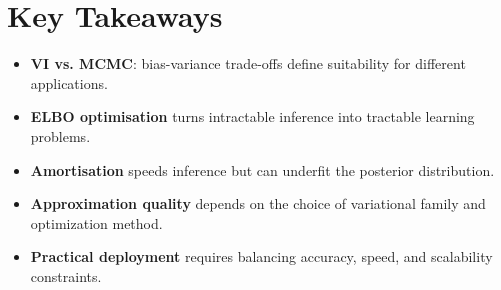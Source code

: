 
\section*{Key Takeaways}

\begin{keytakeaways}
\begin{itemize}[leftmargin=2em]
    \item \textbf{VI vs. MCMC}: bias-variance trade-offs define suitability for different applications.
    \item \textbf{ELBO optimisation} turns intractable inference into tractable learning problems.
    \item \textbf{Amortisation} speeds inference but can underfit the posterior distribution.
    \item \textbf{Approximation quality} depends on the choice of variational family and optimization method.
    \item \textbf{Practical deployment} requires balancing accuracy, speed, and scalability constraints.
\end{itemize}
\end{keytakeaways}


